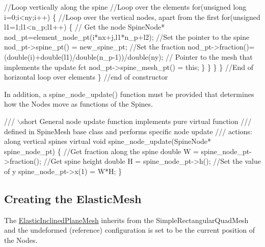 \begin{DoxyCodeInclude}
       \textcolor{comment}{//Loop vertically along the spine}
       \textcolor{comment}{//Loop over the elements }
       \textcolor{keywordflow}{for}(\textcolor{keywordtype}{unsigned} \textcolor{keywordtype}{long} i=0;i<ny;i++)
        \{
         \textcolor{comment}{//Loop over the vertical nodes, apart from the first}
         \textcolor{keywordflow}{for}(\textcolor{keywordtype}{unsigned} l1=1;l1<n\_p;l1++)
          \{
           \textcolor{comment}{// Get the node}
           SpineNode* nod\_pt=element\_node\_pt(i*nx+j,l1*n\_p+l2);
           \textcolor{comment}{//Set the pointer to the spine}
           nod\_pt->spine\_pt() = new\_spine\_pt;
           \textcolor{comment}{//Set the fraction}
           nod\_pt->fraction()=(double(i)+double(l1)/double(n\_p-1))/\textcolor{keywordtype}{double}(ny);
           \textcolor{comment}{// Pointer to the mesh that implements the update fct}
           nod\_pt->spine\_mesh\_pt() = \textcolor{keyword}{this}; 
          \}  
        \}
      \}
    \} \textcolor{comment}{//End of horizontal loop over elements  }
  \} \textcolor{comment}{//end of constructor}

\end{DoxyCodeInclude}
 In addition, a {\ttfamily spine\+\_\+node\+\_\+update()} function must be provided that determines how the {\ttfamily Nodes} move as functions of the {\ttfamily Spines}. 
\begin{DoxyCodeInclude}
 \textcolor{comment}{/// \(\backslash\)short General node update function implements pure virtual function }
\textcolor{comment}{ /// defined in SpineMesh base class and performs specific node update}
\textcolor{comment}{}\textcolor{comment}{ /// actions:  along vertical spines}
\textcolor{comment}{} \textcolor{keyword}{virtual} \textcolor{keywordtype}{void} spine\_node\_update(SpineNode* spine\_node\_pt)
  \{
   \textcolor{comment}{//Get fraction along the spine}
   \textcolor{keywordtype}{double} W = spine\_node\_pt->fraction();
   \textcolor{comment}{//Get spine height}
   \textcolor{keywordtype}{double} H = spine\_node\_pt->h();
   \textcolor{comment}{//Set the value of y}
   spine\_node\_pt->x(1) = W*H;
  \}

\end{DoxyCodeInclude}
\hypertarget{index_elastic_mesh}{}\subsection{Creating the Elastic\+Mesh}\label{index_elastic_mesh}
The {\ttfamily \hyperlink{classElasticInclinedPlaneMesh}{Elastic\+Inclined\+Plane\+Mesh}} inherits from the {\ttfamily Simple\+Rectangular\+Quad\+Mesh} and the undeformed (reference) configuration is set to be the current position of the {\ttfamily Nodes}. 
